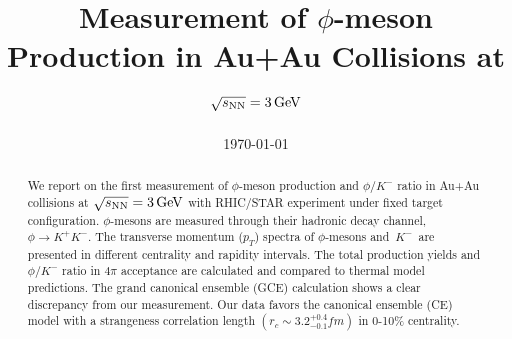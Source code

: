 \documentclass[%
 reprint,	
showpacs,
 amsmath,amssymb,
 aps,
 prc,
]{revtex4-1}
\begin{document}

\title{Measurement of $\phi$-meson Production in Au+Au Collisions at ${\sqrt{s_{\rm NN}} = \rm{3\,GeV}}$}%


\noaffiliation

\date{\today}%

\begin{abstract}


We report on the first measurement of $\phi$-meson production and $\phi/K^-$ ratio in Au+Au collisions at ${\sqrt{s_{\rm NN}} = \rm{3\,GeV}}$ with RHIC/STAR experiment under fixed target configuration. $\phi$-mesons are measured through their hadronic decay channel, $\phi\rightarrow K^+K^-$. The transverse momentum ($p_T$) spectra of $\phi$-mesons and $K^-$ are presented in different centrality and rapidity intervals. The total production yields and $\phi/K^-$ ratio in $4\pi$ acceptance are calculated and compared to thermal model predictions. The grand canonical ensemble (GCE) calculation shows a clear discrepancy from our measurement. Our data favors the canonical ensemble (CE) model with a strangeness correlation length $(r_c   \sim 3.2_{-0.1}^{+0.4} fm)$ in 0-10\% centrality.


\end{abstract}
\end{document}
